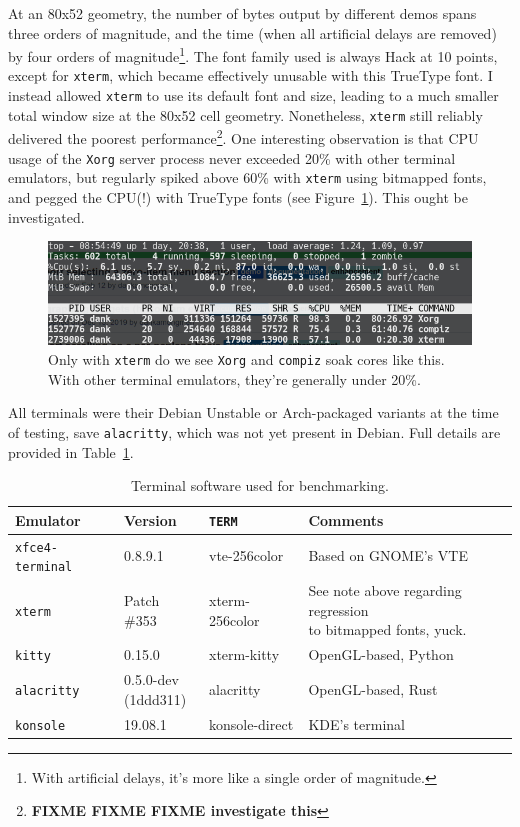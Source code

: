 At an 80x52 geometry,
the number of bytes output by different demos spans three orders of magnitude,
and the time (when all artificial delays are removed) by four orders of
magnitude\footnote{With artificial delays, it's more like a single order of
magnitude.}. The font family used is always Hack\cite{hacktypeface} at 10 points,
except for \texttt{xterm}, which became effectively unusable with this TrueType
font. I instead allowed \texttt{xterm} to use its default font and size, leading
to a much smaller total window size at the 80x52 cell geometry. Nonetheless,
\texttt{xterm} still reliably delivered the poorest performance\footnote{\textbf{FIXME FIXME FIXME investigate this}}.
One interesting observation is that CPU usage of the \texttt{Xorg} server process
never exceeded 20\% with other terminal emulators, but regularly spiked above 60\%
with \texttt{xterm} using bitmapped fonts, and pegged the CPU(!) with TrueType
fonts (see Figure~\ref{fig:badxterm}). This ought be investigated.

\begin{figure}[!htb]
  \centering
\includegraphics[width=1\textwidth]{media/xterm-high-cpu.png}
\caption[Odd performance from \texttt{xterm}.]{Only with \texttt{xterm} do we see \texttt{Xorg} and \texttt{compiz}
  soak cores like this. With other terminal emulators, they're generally under
  20\%.}
\label{fig:badxterm}
\end{figure}

All terminals were their Debian Unstable or Arch-packaged variants at the time
of testing, save \texttt{alacritty}, which was not yet present in Debian. Full
details are provided in Table~\ref{table:benchterms}.

\begin{table}[!htb]
  \centering
  \begin{tabular}{|l|l|l|l|}
    \hline
    Emulator & Version & \texttt{TERM} & Comments \\
    \hline
    \hline
    \texttt{xfce4-terminal} & 0.8.9.1 & vte-256color & Based on GNOME's VTE\cite{gnomevte} \\
    \hline
    \texttt{xterm} & Patch \#353 & xterm-256color & \makecell[l]{See note above regarding regression\\
      to bitmapped fonts, yuck.} \\
    \hline
    \texttt{kitty} & 0.15.0 & xterm-kitty & OpenGL-based, Python \\
    \hline
    \texttt{alacritty} & \makecell[l]{0.5.0-dev\\(1ddd311)} & alacritty & OpenGL-based, Rust \\
    \hline
    \texttt{konsole} & 19.08.1 & konsole-direct & KDE's terminal \\
    \hline
  \end{tabular}
\caption{Terminal software used for benchmarking.}
\label{table:benchterms}
\end{table}

